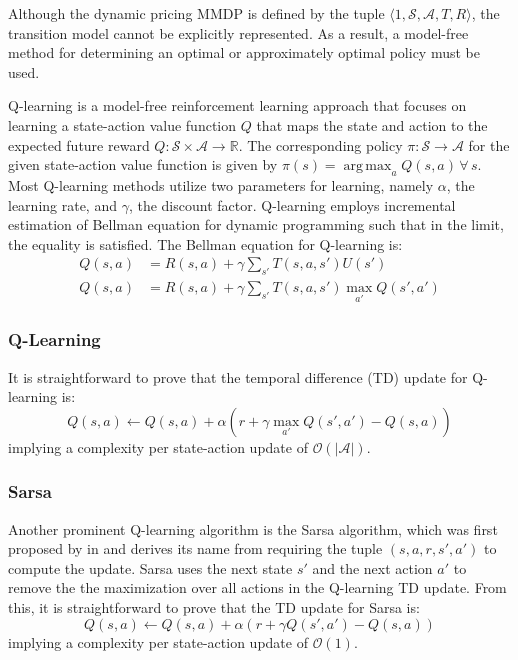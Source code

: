 \documentclass[letterpaper]{article}%
\DeclareMathOperator*{\argmax}{arg\,max}
\begin{document}
Although the dynamic pricing MMDP is defined by the tuple $\langle 1, \mathcal{S}, \mathcal{A}, T, R \rangle$, the transition model cannot be explicitly represented. As a result, a model-free method for determining an optimal or approximately optimal policy must be used. 

Q-learning is a model-free reinforcement learning approach that focuses on learning a state-action value function $Q$ that maps the state and action to the expected future reward $Q: \mathcal{S} \times \mathcal{A} \rightarrow \mathbb{R}$. The corresponding policy $\pi: \mathcal{S} \rightarrow \mathcal{A}$ for the given state-action value function is given by $\pi(s) = \argmax_a Q(s,a) \, \forall \, s$. Most Q-learning methods utilize two parameters for learning, namely $\alpha$, the learning rate, and $\gamma$, the discount factor. Q-learning employs incremental estimation of Bellman equation for dynamic programming such that in the limit, the equality is satisfied. The Bellman equation for Q-learning is:
\begin{align*}
Q(s,a) &= R(s,a) + \gamma \sum_{s'} T(s, a, s')U(s') \\ 
Q(s,a) &= R(s,a) + \gamma \sum_{s'} T(s, a, s') \max_{a'}Q(s', a') 
\end{align*}

\subsubsection{Q-Learning}

It is straightforward to prove that the temporal difference (TD) update for Q-learning is:
$$ Q(s,a) \leftarrow Q(s,a) + \alpha \left( r + \gamma \max_{a'} Q(s', a') - Q(s,a) \right)$$
implying a complexity per state-action update of $\mathcal{O}(|\mathcal{A}|)$.

\subsubsection{Sarsa}

Another prominent Q-learning algorithm is the Sarsa algorithm, which was first proposed by \citeauthor{Rummery1994OnlineSystems} in \citeyear{Rummery1994OnlineSystems} and derives its name from requiring the tuple $(s,a,r,s',a')$ to compute the update. Sarsa uses the next state $s'$ and the next action $a'$ to remove the the maximization over all actions in the Q-learning TD update. From this, it is straightforward to prove that the TD update for Sarsa is:
$$ Q(s,a) \leftarrow Q(s,a) + \alpha \left( r + \gamma Q(s', a') - Q(s,a) \right)$$ 
implying a complexity per state-action update of $\mathcal{O}(1)$.
\end{document}
